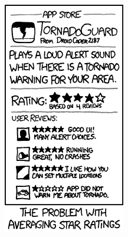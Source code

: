 \begin{figure}
\RawFloats
\centering
\begin{minipage}{.4\textwidth}
  \centering
  \includegraphics[width=\textwidth]{images/xkcd/tornadoguard.png}
  \label{fig:xkcd-tornadoguard}
\end{minipage}\hfill%

\end{figure}

